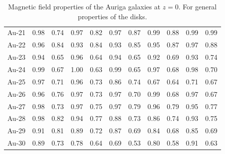 \documentclass[usenatbib]{mnras}
\begin{document}
\begin{table}
\begin{tabular}{c c c c c c c c c c c}
Au-21 & 0.98 & 0.74 & 0.97 & 0.82 & 0.97 & 0.87 & 0.99 & 0.88 & 0.99 & 0.99\\
Au-22 & 0.96 & 0.84 & 0.93 & 0.84 & 0.93 & 0.85 & 0.95 & 0.87 & 0.97 & 0.88\\
Au-23 & 0.94 & 0.65 & 0.96 & 0.64 & 0.94 & 0.65 & 0.92 & 0.69 & 0.93 & 0.74\\
Au-24 & 0.99 & 0.67 & 1.00 & 0.63 & 0.99 & 0.65 & 0.97 & 0.68 & 0.98 & 0.70\\
Au-25 & 0.97 & 0.71 & 0.96 & 0.73 & 0.86 & 0.74 & 0.67 & 0.64 & 0.71 & 0.67\\
Au-26 & 0.96 & 0.76 & 0.97 & 0.73 & 0.97 & 0.70 & 0.99 & 0.68 & 0.97 & 0.67\\
Au-27 & 0.98 & 0.73 & 0.97 & 0.75 & 0.97 & 0.79 & 0.96 & 0.79 & 0.95 & 0.77\\
Au-28 & 0.98 & 0.82 & 0.94 & 0.77 & 0.88 & 0.73 & 0.86 & 0.74 & 0.93 & 0.75\\
Au-29 & 0.91 & 0.81 & 0.89 & 0.72 & 0.87 & 0.69 & 0.84 & 0.68 & 0.85 & 0.69\\
Au-30 & 0.89 & 0.73 & 0.78 & 0.64 & 0.69 & 0.53 & 0.80 & 0.58 & 0.91 & 0.63\\
  \hline\hline
  \end{tabular}
  \label{table:MHD}
  \caption{Magnetic field properties of the Auriga galaxies at $z=0$. For general properties of the disks.}
\end{table}
\end{document}
